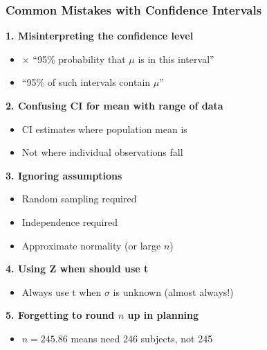 \documentclass{beamer}
\begin{document}
\begin{frame}
\frametitle{Common Mistakes with Confidence Intervals}
\textbf{1. Misinterpreting the confidence level}
\begin{itemize}
\item $\times$ ``95\% probability that $\mu$ is in this interval''
\item \checkmark ``95\% of such intervals contain $\mu$''
\end{itemize}

\vspace{0.3cm}
\textbf{2. Confusing CI for mean with range of data}
\begin{itemize}
\item CI estimates where population mean is
\item Not where individual observations fall
\end{itemize}

\vspace{0.3cm}
\textbf{3. Ignoring assumptions}
\begin{itemize}
\item Random sampling required
\item Independence required
\item Approximate normality (or large $n$)
\end{itemize}

\vspace{0.3cm}
\textbf{4. Using Z when should use t}
\begin{itemize}
\item Always use t when $\sigma$ is unknown (almost always!)
\end{itemize}

\vspace{0.3cm}
\textbf{5. Forgetting to round $n$ up in planning}
\begin{itemize}
\item $n = 245.86$ means need 246 subjects, not 245
\end{itemize}
\end{frame}
\end{document}
